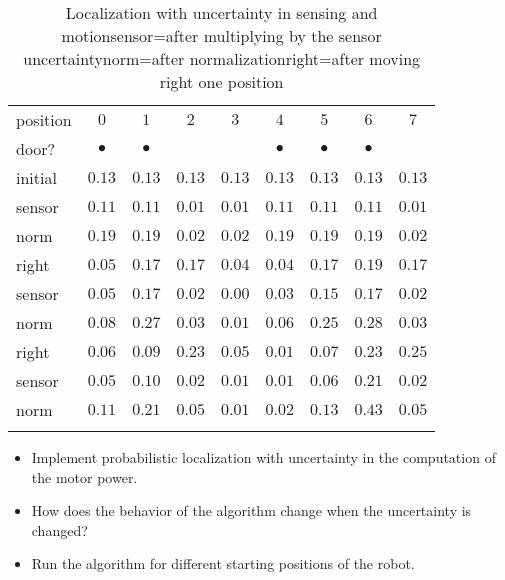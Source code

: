 \begin{table}
\caption[Localization with uncertainty in sensing and motion]{Localization with uncertainty in sensing and motion\newline{}sensor=after multiplying by the sensor uncertainty\newline{}norm=after normalization\newline{}right=after moving right one position}\label{tab.uncertain-sensing-motion}
\setlength{\tabcolsep}{6pt}
\begin{tabular}{l|rrrrrrrr}
\svhline\noalign{\smallskip}
position&\multicolumn{1}{c}{$0$}&\multicolumn{1}{c}{$1$}&\multicolumn{1}{c}{$2$}&\multicolumn{1}{c}{$3$}&\multicolumn{1}{c}{$4$}&\multicolumn{1}{c}{$5$}&\multicolumn{1}{c}{$6$}&\multicolumn{1}{c}{$7$}\\
door?&\multicolumn{1}{c}{$\bullet$}&\multicolumn{1}{c}{$\bullet$}&&&\multicolumn{1}{c}{$\bullet$}&\multicolumn{1}{c}{$\bullet$}&\multicolumn{1}{c}{$\bullet$}&\\
\svhline\noalign{\smallskip}
initial  & $0.13$ & $0.13$ & $0.13$ & $0.13$ & $0.13$ & $0.13$ & $0.13$ & $0.13$\\
sensor & $0.11$ & $0.11$ & $0.01$ & $0.01$ & $0.11$ & $0.11$ & $0.11$ & $0.01$\\
norm     & $0.19$ & $0.19$ & $0.02$ & $0.02$ & $0.19$ & $0.19$ & $0.19$ & $0.02$\\
\hline
right    & $0.05$ & $0.17$ & $0.17$ & $0.04$ & $0.04$ & $0.17$ & $0.19$ & $0.17$\\
sensor & $0.05$ & $0.17$ & $0.02$ & $0.00$ & $0.03$ & $0.15$ & $0.17$ & $0.02$\\
norm     & $0.08$ & $0.27$ & $0.03$ & $0.01$ & $0.06$ & $0.25$ & $0.28$ & $0.03$\\
\hline
right    & $0.06$ & $0.09$ & $0.23$ & $0.05$ & $0.01$ & $0.07$ & $0.23$ & $0.25$\\
sensor & $0.05$ & $0.10$ & $0.02$ & $0.01$ & $0.01$ & $0.06$ & $0.21$ & $0.02$\\
norm     & $0.11$ & $0.21$ & $0.05$ & $0.01$ & $0.02$ & $0.13$ & $0.43$ & $0.05$\\
\noalign{\smallskip}\svhline\noalign{\smallskip}
\end{tabular}
\end{table}

\begin{framed}
\begin{itemize}
\item Implement probabilistic localization with uncertainty in the computation of the motor power.
\item How does the behavior of the algorithm change when the uncertainty is changed?
\item Run the algorithm for different starting positions of the robot.
\end{itemize}
\end{framed}



